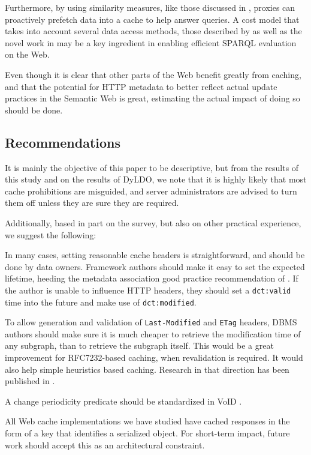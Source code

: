 \documentclass{llncs}
\newcommand{\rdfterm}[1]{\texttt{#1}}
\newcommand{\httph}[1]{\texttt{#1}}
\begin{document}
Furthermore, by using similarity measures, like those discussed in
\cite{dividino2013following}, proxies can proactively prefetch data
into a cache to help answer queries. A cost model that takes into
account several data access methods, those described by
\cite{hogan2014paths} as well as  the novel work in \cite{ldf1} may be
a key ingredient in enabling efficient SPARQL evaluation on the Web.


Even though it is clear that other parts of the Web benefit greatly
from caching, and that the potential for HTTP metadata to better
reflect actual update practices in the Semantic Web is great,
estimating the actual impact of doing so should be done.

\subsection{Recommendations}

It is mainly the objective of this paper to be descriptive, but from
the results of this study and on the results of DyLDO, we note that it
is highly likely that most cache prohibitions are misguided, and
server administrators are advised to turn them off unless they are
sure they are required.

Additionally, based in part on the survey, but also on other practical
experience, we suggest the following:

In many cases, setting reasonable cache headers is straightforward,
and should be done by data owners. Framework authors should make it
easy to set the expected lifetime, heeding the metadata association
good practice recommendation of \cite{Jacobs:04:AWW}. If the author is
unable to influence HTTP headers, they should set a
\rdfterm{dct:valid} time into the future and make use of
\rdfterm{dct:modified}.

To allow generation and validation of \httph{Last-Modified} and
\httph{ETag} headers, DBMS authors should make sure it is much cheaper
to retrieve the modification time of any subgraph, than to retrieve
the subgraph itself. This would be a great improvement for
RFC7232-based caching, when revalidation is required. It would also
help simple heuristics based caching. Research in that direction has
been published in \cite{kaseicache}.

A change periodicity predicate should be standardized in VoID \cite{voidnote}.

All Web cache implementations we have studied have cached responses in
the form of a key that identifies a serialized object. For short-term
impact, future work should accept this as an architectural constraint.
\end{document}
